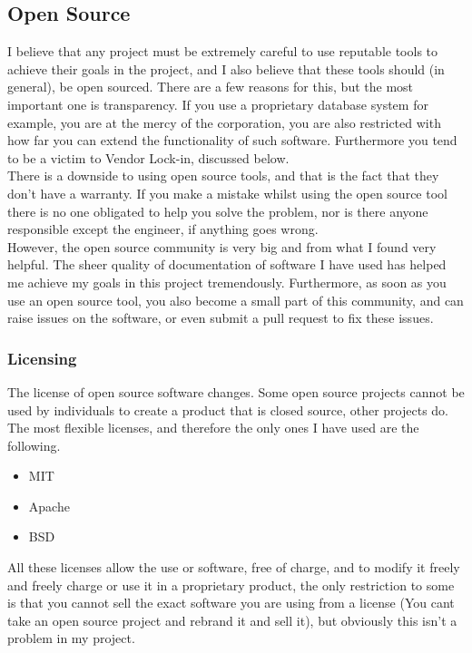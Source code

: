 \documentclass[titlepage]{article}
\begin{document}
\subsection{Open Source}
I believe that any project must be extremely careful to use reputable tools to achieve their goals in the project, and I also believe that these tools should (in general), be open sourced. There are a few reasons for this, but the most important one is transparency. If you use a proprietary database system for example, you are at the mercy of the corporation, you are also restricted with how far you can extend the functionality of such software. Furthermore you tend to be a victim to Vendor Lock-in, discussed below. \\ 

There is a downside to using open source tools, and that is the fact that they don't have a warranty. If you make a mistake whilst using the open source tool there is no one obligated to help you solve the problem, nor is there anyone responsible except the engineer, if anything goes wrong.  \\

However, the open source community is very big and from what I found very helpful. The sheer quality of documentation of software I have used has helped me achieve my goals in this project tremendously. Furthermore, as soon as you use an open source tool, you also become a small part of this community, and can raise issues on the software, or even submit a pull request to fix these issues. 

\subsubsection{Licensing}
The license of open source software changes. Some open source projects cannot be used by individuals to create a product that is closed source, other projects do. The most flexible licenses, and therefore the only ones I have used are the following.

\begin{itemize}
  \item MIT~\cite{mit}
  \item Apache~\cite{apache}
  \item BSD~\cite{bsd}
\end{itemize}

All these licenses allow the use or software, free of charge, and to modify it freely and freely charge or use it in a proprietary product, the only restriction to some is that you cannot sell the exact software you are using from a license (You cant take an open source project and rebrand it and sell it), but obviously this isn't a problem in my project.
\end{document}
